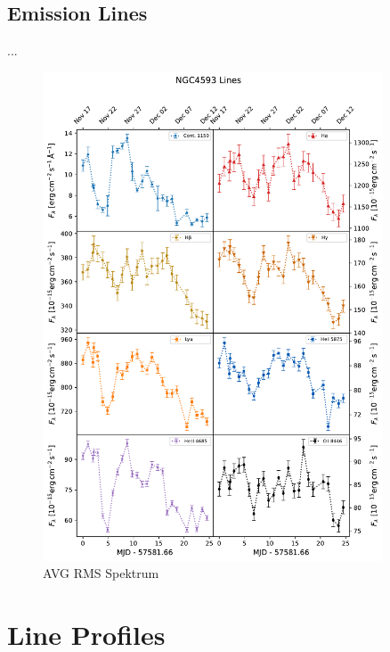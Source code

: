 \subsection{Emission Lines}
...
\begin{figure}[!ht]
	\centering
	\includegraphics[width=0.9\textwidth]{pictures/Chapter4/lightcurves/NGC4593_Lines.pdf}
	\caption{AVG RMS Spektrum}
	\label{fig:emission_line_lightcurves}
\end{figure}



\section{Line Profiles}

